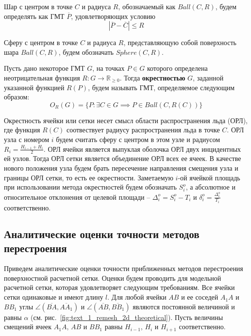 Шар с центром в точке $C$ и радиуса $R$, обозначаемый как $Ball(C, R)$, будем определять как ГМТ $\overline{P}$, удовлетворяющих условию
\begin{equation}
	|\overline{P} - \overline{C}| \le R
\end{equation}

Сферу с центром в точке $C$ и радиуса $R$, представляющую собой поверхность шара $Ball(C, R)$, будем обозначать $Sphere(C, R)$.

\begin{definition}
Пусть дано некоторое ГМТ $G$, на точках $P \in G$ которого определена неотрицательная функция $R: G \rightarrow \mathbb{R}_{\ge 0}$.
Тогда \textbf{окрестностью}\label{term:okrestnost} $G$, заданной указанной функцией $R(P)$, будем называть ГМТ, определяемое следующим образом:
\begin{equation}
	O_R(G) = \{ P: \exists C \in G \implies P \in Ball(C, R(C)) \}
\end{equation}
\end{definition}

Окрестность ячейки или сетки несет смысл области распространения льда (ОРЛ), где функция $R(C)$ соотвествует радиусу распространения льда в точке $C$.
ОРЛ узла с номером $i$ будем считать сферу с центром в этом узле и радиусом $R_i = \frac{H_{i - 1} + H_i}{2}$.
ОРЛ ячейки является выпуклая оболочка ОРЛ двух инцидентных ей узлов.
Тогда ОРЛ сетки является объединение ОРЛ всех ее ячеек.
В качестве нового положения узла будем брать пересечение направления смещения узла и границы ОРЛ сетки, то есть ее окрестности.
Заметаемую $i$-ой ячейкой площадь при использовании метода окрестностей будем обозначать $S_i^o$, а абсолютное и относительное отклонения от целевой площади -- $\Delta_i^o = S_i^o - T_i$ и $\delta_i^o = \frac{\Delta_i^o}{T_i}$ соответственно.


\subsection{Аналитические оценки точности методов перестроения}

Приведем аналитические оценки точности приближенных методов перестроения поверхностной расчетной сетки.
Оценки будем проводить для модельной расчетной сетки, которая удовлетворяет следующим требованиям.
Все ячейки сетки одинаковые и имеют длину $l$.
Для любой ячейки $AB$ и ее соседей $A_1A$ и $BB_1$ углы $\angle (\overline{BA}, \overline{AA_1})$ и $\angle (\overline{AB}, \overline{BB_1})$ являются постоянной величиной и равны $\alpha$ (см. рис.~\ref{fig:text_1_remesh_2d_theoretical}).
Пусть величины смещений ячеек $A_1A$, $AB$ и $BB_1$ равны $H_{i - 1}$, $H_i$ и $H_{i + 1}$ соответственно.

